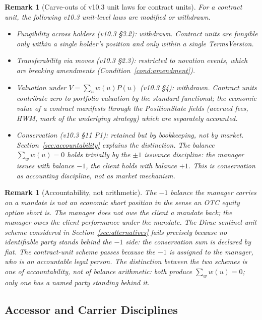 \documentclass[11pt,a4paper]{article}
\newtheorem{remark}[definition]{Remark}
\begin{document}
\begin{remark}[Carve-outs of v10.3 unit laws for contract units]
\label{rem:carveouts}
For a contract unit, the following v10.3 unit-level laws are modified or withdrawn.
\begin{itemize}[leftmargin=*,nosep]
\item \emph{Fungibility across holders} (v10.3 \S 3.2): withdrawn. Contract units are fungible only within a single holder's position and only within a single \textit{TermsVersion}.
\item \emph{Transferability via moves} (v10.3 \S 2.3): restricted to novation events, which are breaking amendments (Condition~\ref{cond:amendment}).
\item \emph{Valuation under $V = \sum_u w(u) P(u)$} (v10.3 \S 4): withdrawn. Contract units contribute zero to portfolio valuation by the standard functional; the economic value of a contract manifests through the \textit{PositionState} fields (accrued fees, HWM, mark of the underlying strategy) which are separately accounted.
\item \emph{Conservation} (v10.3 \S 11 P1): \emph{retained but by bookkeeping, not by market}. Section~\ref{sec:accountability} explains the distinction. The balance $\sum_w w(u) = 0$ holds trivially by the $\pm 1$ issuance discipline: the manager issues with balance $-1$, the client holds with balance $+1$. This is conservation as accounting discipline, not as market mechanism.
\end{itemize}
\end{remark}

\begin{remark}[Accountability, not arithmetic]
\label{rem:accountability}
\label{sec:accountability}
The $-1$ balance the manager carries on a mandate is not an economic short position in the sense an OTC equity option short is. The manager does not owe the client a mandate back; the manager owes the client \emph{performance under the mandate}. The Dirac sentinel-unit scheme considered in Section~\ref{sec:alternatives} fails precisely because no identifiable party stands behind the $-1$ side: the conservation sum is declared by fiat. The contract-unit scheme passes because the $-1$ is assigned to the manager, who is an accountable legal person. The distinction between the two schemes is one of accountability, not of balance arithmetic: both produce $\sum_w w(u) = 0$; only one has a named party standing behind it.
\end{remark}

\subsection{Accessor and Carrier Disciplines}
\end{document}
